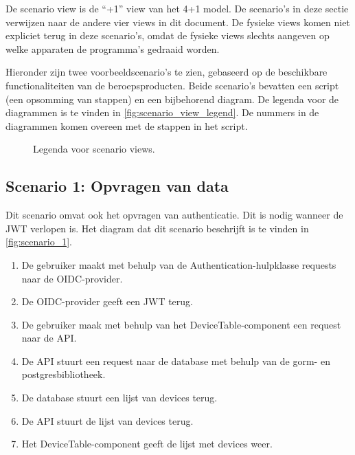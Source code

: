 \documentclass[../views.tex]{subfiles}
\begin{document}
De scenario view is de ``+1'' view van het 4+1 model. De scenario's in deze sectie verwijzen naar de andere vier views in dit document. De fysieke views komen niet expliciet terug in deze scenario's, omdat de fysieke views slechts aangeven op welke apparaten de programma's gedraaid worden.

Hieronder zijn twee voorbeeldscenario's te zien, gebaseerd op de beschikbare functionaliteiten van de beroepsproducten. Beide scenario's bevatten een script (een opsomming van stappen) en een bijbehorend diagram. De legenda voor de diagrammen is te vinden in \autoref{fig:scenario_view_legend}. De nummers in de diagrammen komen overeen met de stappen in het script.

\begin{figure}[ht]
  \centering
  \caption{Legenda voor scenario views.}
  \label{fig:scenario_view_legend}
\end{figure}

\subsection{Scenario 1: Opvragen van data}
\label{subsec:scenario_1}

Dit scenario omvat ook het opvragen van authenticatie. Dit is nodig wanneer de JWT verlopen is. Het diagram dat dit scenario beschrijft is te vinden in \autoref{fig:scenario_1}.

\begin{enumerate}
  \item De gebruiker maakt met behulp van de Authentication-hulpklasse requests naar de OIDC-provider.
  \item De OIDC-provider geeft een JWT terug.
  \item De gebruiker maak met behulp van het DeviceTable-component een request naar de API.
  \item De API stuurt een request naar de database met behulp van de gorm- en postgresbibliotheek.
  \item De database stuurt een lijst van devices terug.
  \item De API stuurt de lijst van devices terug.
  \item Het DeviceTable-component geeft de lijst met devices weer.
\end{enumerate}
\end{document}
